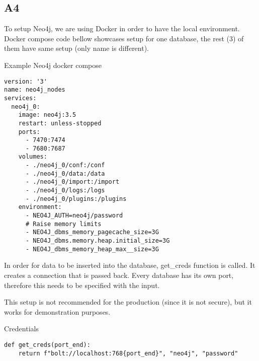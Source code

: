 \subsection{A4}\label{A4}

To setup Neo4j, we are using Docker in order to have the local environment. Docker compose code bellow showcases setup for one database, the rest (3) of them have same setup (only name is different). 
\begin{listing}[H]
\caption{Example Neo4j docker compose}
\begin{verbatim}
version: '3'
name: neo4j_nodes
services:
  neo4j_0:
    image: neo4j:3.5
    restart: unless-stopped
    ports:
      - 7470:7474
      - 7680:7687
    volumes:
      - ./neo4j_0/conf:/conf
      - ./neo4j_0/data:/data
      - ./neo4j_0/import:/import
      - ./neo4j_0/logs:/logs
      - ./neo4j_0/plugins:/plugins
    environment: 
      - NEO4J_AUTH=neo4j/password
      # Raise memory limits
      - NEO4J_dbms_memory_pagecache_size=3G
      - NEO4J_dbms.memory.heap.initial_size=3G
      - NEO4J_dbms_memory_heap_max__size=3G
\end{verbatim}
\end{listing}

In order for data to be inserted into the database, get\_creds function is called. It creates a connection that is passed back. Every database has its own port, therefore this needs to be specified with the input. 

This setup is not recommended for the production (since it is not secure), but it works for demonstration purposes.
\begin{listing}[H]
\caption{Credentials}
\begin{verbatim}
def get_creds(port_end):
    return f"bolt://localhost:768{port_end}", "neo4j", "password"
\end{verbatim}
\end{listing}
